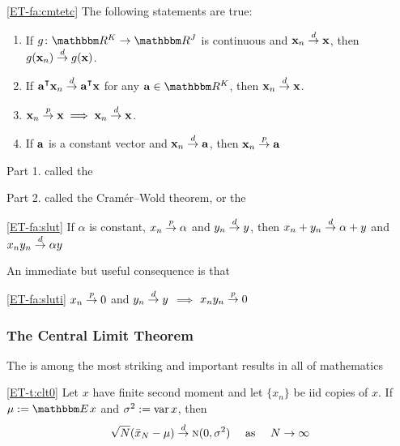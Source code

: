 \begin{frame}

    \vspace{2em}
    \Fact\eqref{ET-fa:cmtetc}
    The following statements are true:
    \begin{enumerate}
        \item If $g \colon \RR^K \to \RR^J$ is continuous and
            ${\mathbf x}_n \stackrel { d } {\to} {\mathbf x}$, then $g({\mathbf x}_n) \stackrel { d } {\to} g({\mathbf x})$.
        \item If $\bolda^\T \boldx_n \tod \bolda^\T \boldx$ for any $\bolda \in \RR^K$,
            then ${\mathbf x}_n \stackrel { d } {\to} {\mathbf x}$.
        \item ${\mathbf x}_n \stackrel { p } {\to} {\mathbf x} \implies {\mathbf x}_n \stackrel { d } {\to} {\mathbf x}$.
        \item If ${\mathbf a}$ is a constant vector and ${\mathbf x}_n \stackrel { d } {\to} {\mathbf a}$,
            then ${\mathbf x}_n \stackrel { p } {\to} {\mathbf a}$
    \end{enumerate}
    
    Part 1. called the 
    
    Part 2.  called the 
    Cram\'er--Wold theorem, or the 
    
\end{frame}

\begin{frame}

    \vspace{2em}
    \Fact\eqref{ET-fa:slut}
        If $\alpha$ is constant, $x_n \stackrel { p } {\to} \alpha$ and $y_n \stackrel { d } {\to} y$, then
            $x_n + y_n \stackrel { d } {\to} \alpha + y$ and $x_n y_n \stackrel { d } {\to} \alpha y$
    
    \vspace{1em}
    An immediate but useful consequence is that 
    
    \Fact\eqref{ET-fa:sluti}
        $x_n \stackrel { p } {\to} 0$ and $y_n \stackrel { d } {\to} y$ $\implies$ $x_n y_n \stackrel { p } {\to} 0$

\end{frame}


\begin{frame}\frametitle{The Central Limit Theorem}

    \vspace{2em}
    The  
    is among the most striking and important results in all of
    mathematics
    
    \vspace{1em}
    \Thm\eqref{ET-t:clt0}
        Let $x$ have finite second
        moment and let $\{x_n\}$ be {\sc iid} copies of $x$.  If
        $\mu := \EE x$ and $\sigma^2 := \operatorname{var} x$, then
        \begin{equation*}
            \label{eq:clt0}
            \sqrt{N} (\bar x_N - \mu) 
            \stackrel { d } {\to} \textrm{\sc n}(0, \sigma^2)
             \quad \text{ as } \quad
             N \to \infty
        \end{equation*}
        
\end{frame}

